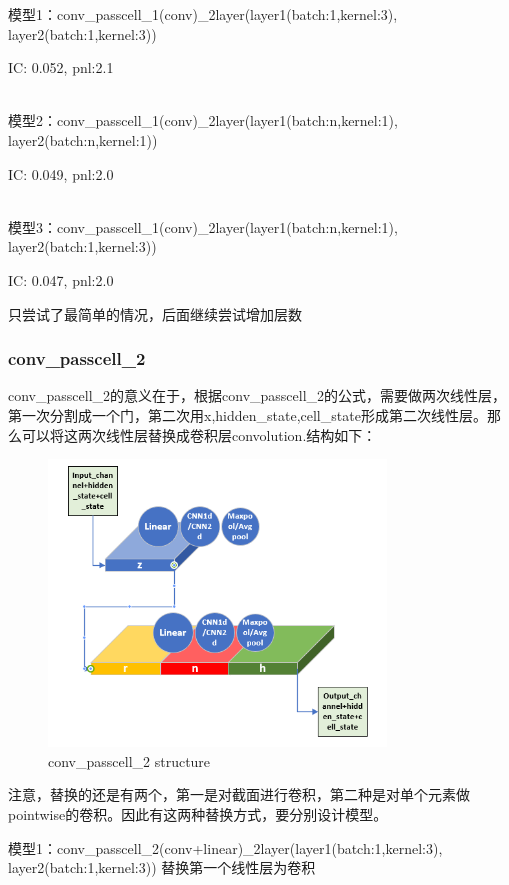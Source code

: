 \documentclass[11pt]{ctexart}
\begin{document}
模型1：conv\_passcell\_1(conv)\_2layer(layer1(batch:1,kernel:3), layer2(batch:1,kernel:3))

{\kaishu \small IC: 0.052, pnl:2.1}

~\\
模型2：conv\_passcell\_1(conv)\_2layer(layer1(batch:n,kernel:1), layer2(batch:n,kernel:1))

{\kaishu \small IC: 0.049, pnl:2.0}

~\\
模型3：conv\_passcell\_1(conv)\_2layer(layer1(batch:n,kernel:1), layer2(batch:1,kernel:3))

{\kaishu \small IC: 0.047, pnl:2.0}

只尝试了最简单的情况，后面继续尝试增加层数


\subsubsection{conv\_passcell\_2}
conv\_passcell\_2的意义在于，根据conv\_passcell\_2的公式，需要做两次线性层，第一次分割成一个门，第二次用x,hidden\_state,cell\_state形成第二次线性层。那么可以将这两次线性层替换成卷积层convolution.结构如下：
\begin{figure}[H]
\begin{center}
\includegraphics[width=0.8\textwidth]{str6.PNG}
\end{center}
\caption{conv\_passcell\_2 structure}
\label{FIG.7}
\end{figure}

注意，替换的还是有两个，第一是对截面进行卷积，第二种是对单个元素做pointwise的卷积。因此有这两种替换方式，要分别设计模型。

模型1：conv\_passcell\_2(conv+linear)\_2layer(layer1(batch:1,kernel:3), layer2(batch:1,kernel:3)) 替换第一个线性层为卷积
\end{document}
